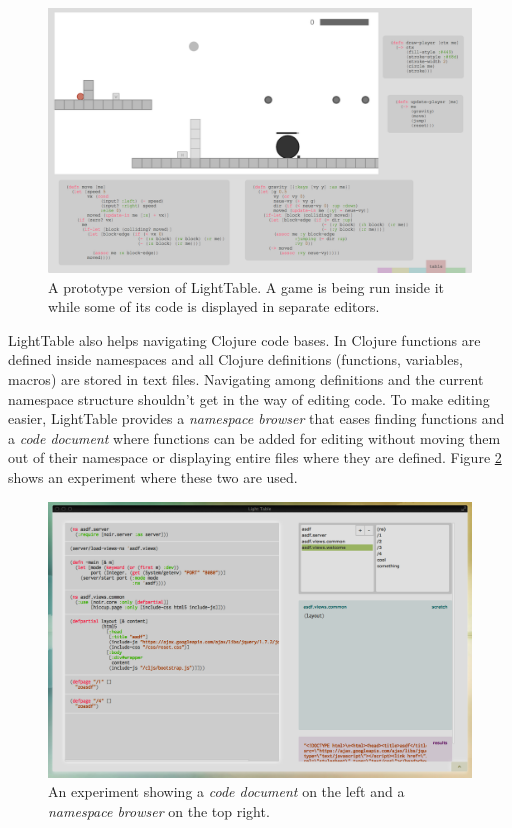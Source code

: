 \documentclass{./llncs2e/llncs}
\begin{document}
	\begin{figure}
	  \centering
	  \includegraphics[width=1.0\textwidth]{img/lt_game_example__inv}
	    \caption{A prototype version of LightTable. A game is being run inside it while some of its code is displayed in separate editors.}
	  \label{fig:lt:draft:table}
	\end{figure} 

	LightTable also helps navigating Clojure code bases.
	In Clojure functions are defined inside namespaces and all Clojure definitions (functions, variables, macros) are stored in text files. 
	Navigating among definitions and the current namespace structure shouldn't get in the way of editing code. 
	To make editing easier, LightTable provides a \emph{namespace browser} that eases finding functions and a \emph{code document} where functions can be added for editing without moving them out of their namespace or displaying entire files where they are defined. 
	Figure \ref{fig:lt:clojure:table} shows an experiment where these two are used.

	\begin{figure}
	  \centering
	  \includegraphics[width=1.0\textwidth]{img/lt_clojure_table__inv}
	    \caption{An experiment showing a \emph{code document} on the left and a \emph{namespace browser} on the top right.}
	  \label{fig:lt:clojure:table}
	\end{figure} 
\end{document}
